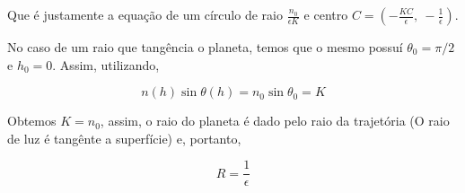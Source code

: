 \documentclass[11pt]{article}
\begin{document}
\begin{pproblem}
\begin{pssolution*}{}{}
\begin{alternativas}
        Que é justamente a equação de um círculo de raio \(\frac{n_0}{\epsilon K}\) e centro \(C = (-\frac{KC}{\epsilon}, \ - \frac{1}{\epsilon})\).

        \item No caso de um raio que tangência o planeta, temos que o mesmo possuí \(\theta_0 = \pi/2\) e \(h_0=0\). Assim, utilizando, 
        
        \[n(h)\sin\theta(h) = n_0\sin\theta_0 = K\]

        Obtemos \(K = n_0\), assim, o raio do planeta é dado pelo raio da trajetória (O raio de luz é tangênte a superfície) e, portanto, 

        \[\boxed{R = \frac{1}{\epsilon}}\]
    \end{alternativas}
    
\end{pssolution*}
\end{pproblem}
\end{document}
